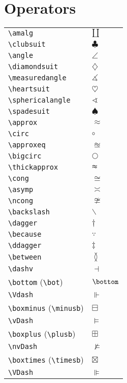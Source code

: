 \documentclass[text,xhtml,itex]{internet}
\begin{document}
\section{Operators}

\begin{tabular}{ll}
\verb+\amalg+ & \(\amalg\) \\
\verb+\clubsuit+     & \(\clubsuit\) \\
\verb+\angle+ & \(\angle\)           \\
\verb+\diamondsuit+ & \(\diamondsuit\) \\
\verb+\measuredangle+ & \(\measuredangle\) \\
\verb+\heartsuit+ & \(\heartsuit\) \\
\verb+\sphericalangle+ & \(\sphericalangle\)  \\
\verb+\spadesuit+ & \(\spadesuit\) \\
\verb+\approx+ & \(\approx\) \\
\verb+\circ+ & \(\circ\) \\
\verb+\approxeq+              & \(\approxeq\) \\
\verb+\bigcirc+ & \(\bigcirc\) \\
\verb+\thickapprox+ & \(\thickapprox\)     \\
\verb+\cong+ & \(\cong\) \\
\verb+\asymp+ & \(\asymp\) \\
\verb+\ncong+ & \(\ncong\) \\
\verb+\backslash+             & \(\backslash\) \\
\verb+\dagger+ & \(\dagger\) \\
\verb+\because+ & \(\because\)         \\
\verb+\ddagger+ & \(\ddagger\) \\
\verb+\between+ & \(\between\) \\
\verb+\dashv+ & \(\dashv\) \\
\verb+\bottom+ (\verb+\bot+) & \(\bottom\) \\
\verb+\Vdash+ & \(\Vdash\) \\
\verb+\boxminus+ (\verb+\minusb+) & \(\boxminus\)        \\
\verb+\vDash+ & \(\vDash\) \\
\verb+\boxplus+ (\verb+\plusb+) & \(\boxplus\) \\
\verb+\nvDash+ & \(\nvDash\) \\
\verb+\boxtimes+ (\verb+\timesb+) & \(\boxtimes\) \\
\verb+\VDash+ & \(\VDash\) \\

\end{tabular}
\end{document}
